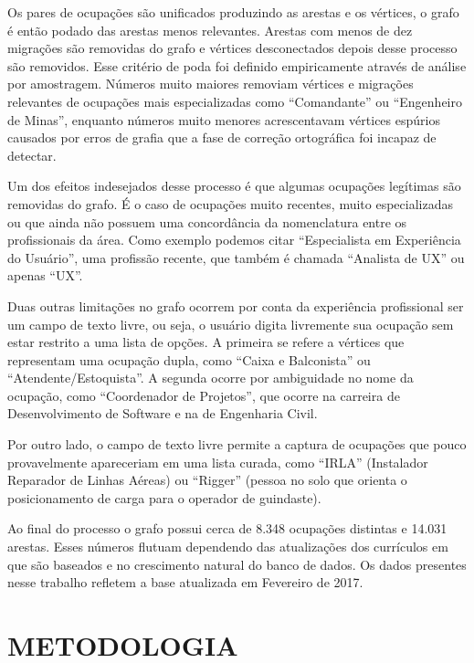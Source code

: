\documentclass[12pt,a4paper]{article}
\begin{document}
Os pares de ocupações são unificados produzindo as arestas e os vértices, o grafo é então podado das arestas menos relevantes. Arestas com menos de dez migrações são removidas do grafo e vértices desconectados depois desse processo são removidos. Esse critério de poda foi definido empiricamente através de análise por amostragem. Números muito maiores removiam vértices e migrações relevantes de ocupações mais especializadas como \enquote{Comandante} ou \enquote{Engenheiro de Minas}, enquanto números muito menores acrescentavam vértices espúrios causados por erros de grafia que a fase de correção ortográfica foi incapaz de detectar.

Um dos efeitos indesejados desse processo é que algumas ocupações legítimas são removidas do grafo. É o caso de ocupações muito recentes, muito especializadas ou que ainda não possuem uma concordância da nomenclatura entre os profissionais da área. Como exemplo podemos citar \enquote{Especialista em Experiência do Usuário}, uma profissão recente, que também é chamada \enquote{Analista de UX} ou apenas \enquote{UX}.

Duas outras limitações no grafo ocorrem por conta da experiência profissional ser um campo de texto livre, ou seja, o usuário digita livremente sua ocupação sem estar restrito a uma lista de opções. A primeira se refere a vértices que representam uma ocupação dupla, como \enquote{Caixa e Balconista} ou \enquote{Atendente/Estoquista}. A segunda ocorre por ambiguidade no nome da ocupação, como \enquote{Coordenador de Projetos}, que ocorre na carreira de Desenvolvimento de Software e na de Engenharia Civil.

Por outro lado, o campo de texto livre permite a captura de ocupações que pouco provavelmente apareceriam em uma lista curada, como \enquote{IRLA} (Instalador Reparador de Linhas Aéreas) ou \enquote{Rigger} (pessoa no solo que orienta o posicionamento de carga para o operador de guindaste).

Ao final do processo o grafo possui cerca de 8.348 ocupações distintas e 14.031 arestas. Esses números flutuam dependendo das atualizações dos currículos em que são baseados e no crescimento natural do banco de dados. Os dados presentes nesse trabalho refletem a base atualizada em Fevereiro de 2017.

\section{METODOLOGIA} \label{sec:metodogia}
\end{document}
